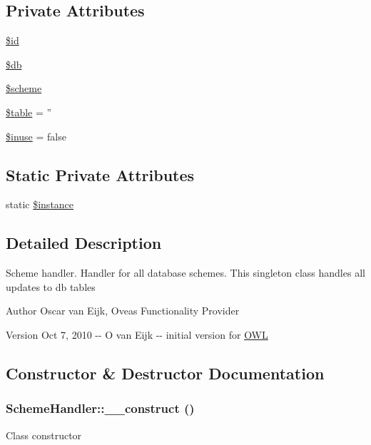 \subsection*{Private Attributes}
\begin{DoxyCompactItemize}
\item 
\hyperlink{classSchemeHandler_af297e966eae06ff1e38a143f93b4aeb9}{\$id}
\item 
\hyperlink{classSchemeHandler_abf3bf26e35b759ccd49f358dedc2dfd1}{\$db}
\item 
\hyperlink{classSchemeHandler_aeb6dfa54ebd11b0d6acc51b8244d598c}{\$scheme}
\item 
\hyperlink{classSchemeHandler_aea92c0f74dbb2e1efd07bdb472660e20}{\$table} = ''
\item 
\hyperlink{classSchemeHandler_a90e5b04603f86c04b1691b2ddf730104}{\$inuse} = false
\end{DoxyCompactItemize}
\subsection*{Static Private Attributes}
\begin{DoxyCompactItemize}
\item 
static \hyperlink{classSchemeHandler_a6f45c52527230b3f3b60d75a9b55e3c1}{\$instance}
\end{DoxyCompactItemize}


\subsection{Detailed Description}
Scheme handler. Handler for all database schemes. This singleton class handles all updates to db tables \begin{DoxyAuthor}{Author}
Oscar van Eijk, Oveas Functionality Provider 
\end{DoxyAuthor}
\begin{DoxyVersion}{Version}
Oct 7, 2010 -\/-\/ O van Eijk -\/-\/ initial version for \hyperlink{classOWL}{OWL} 
\end{DoxyVersion}


\subsection{Constructor \& Destructor Documentation}
\subsubsection[{\_\-\_\-construct}]{\setlength{\rightskip}{0pt plus 5cm}SchemeHandler::\_\-\_\-construct ()}\label{classSchemeHandler_ae528fde31fe73647c614ef6f957c4caf}
Class constructor 


